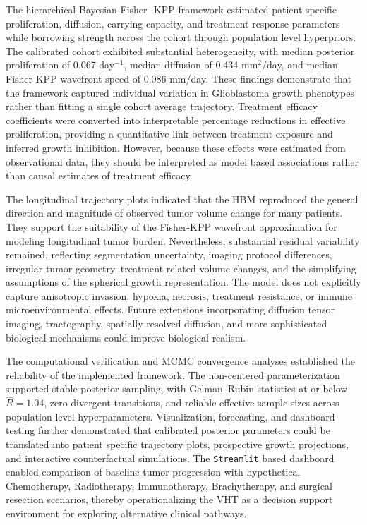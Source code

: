 The hierarchical Bayesian Fisher -KPP framework estimated patient specific proliferation, diffusion, carrying capacity, and treatment response parameters while borrowing strength across the cohort through population level hyperpriors. The calibrated cohort exhibited substantial heterogeneity, with median posterior proliferation of 0.067 day$^{-1}$, median diffusion of 0.434 mm$^2$/day, and median Fisher-KPP wavefront speed of 0.086 mm/day. These findings demonstrate that the framework captured individual variation in Glioblastoma growth phenotypes rather than fitting a single cohort average trajectory. Treatment efficacy coefficients were converted into interpretable percentage reductions in effective proliferation, providing a quantitative link between treatment exposure and inferred growth inhibition. However, because these effects were estimated from observational data, they should be interpreted as model based associations rather than causal estimates of treatment efficacy.

The longitudinal trajectory plots indicated that the HBM reproduced the general direction and magnitude of observed tumor volume change for many patients. They support the suitability of the Fisher-KPP wavefront approximation for modeling longitudinal tumor burden. Nevertheless, substantial residual variability remained, reflecting segmentation uncertainty, imaging protocol differences, irregular tumor geometry, treatment related volume changes, and the simplifying assumptions of the spherical growth representation. The model does not explicitly capture anisotropic invasion, hypoxia, necrosis, treatment resistance, or immune microenvironmental effects. Future extensions incorporating diffusion tensor imaging, tractography, spatially resolved diffusion, and more sophisticated biological mechanisms could improve biological realism.

The computational verification and MCMC convergence analyses established the reliability of the implemented framework. The non-centered parameterization supported stable posterior sampling, with Gelman--Rubin statistics at or below $\widehat{R}=1.04$, zero divergent transitions, and reliable effective sample sizes across population level hyperparameters. Visualization, forecasting, and dashboard testing further demonstrated that calibrated posterior parameters could be translated into patient specific trajectory plots, prospective growth projections, and interactive counterfactual simulations. The \texttt{Streamlit} based dashboard enabled comparison of baseline tumor progression with hypothetical Chemotherapy, Radiotherapy, Immunotherapy, Brachytherapy, and surgical resection scenarios, thereby operationalizing the VHT as a decision support environment for exploring alternative clinical pathways.

